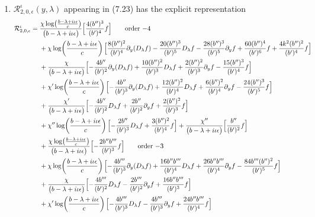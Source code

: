\documentclass[reqno,11pt]{amsart}
\numberwithin{equation}{section}
\newcommand{\p}{\partial}
\newcommand{\D}{D_\lambda}
\numberwithin{equation}{section} %
\begin{document}
\begin{enumerate}
\item $\mathcal{R}^\iota_{2,0,\epsilon}(y,\lambda)$ appearing in (7.23) has the explicit representation
\setlength{\jot}{3pt}
\begin{align}
\mathcal{R}^\iota_{2,0,\epsilon}={}&\frac{\chi\log\!\left(\frac{b -\lambda+i\iota\epsilon}{c}\right)}{\bigl(b -\lambda+i\iota\epsilon\bigr)}\Bigl[\frac{4 (b'' )^{3}}{(b' )^{4}} f\Bigr]\tag*{\text{order $-4$}}\\
&+\chi\log\!\left(\frac{b -\lambda+i\iota\epsilon}{c}\right)\Bigl[\frac{8 (b'' )^{2}}{(b' )^{4}} \p_y(\D f)- \frac{20 (b'' )^{3}}{(b' )^{5}} \D f- \frac{28 (b'' )^{3}}{(b' )^{5}} \p_y f+\frac{60 (b'' )^{4}}{(b' )^{6}} f+\frac{4 k^2 (b'' )^{2}}{(b' )^{4}} f\Bigr]\notag\\
&+\frac{\chi}{\bigl(b -\lambda+i\iota\epsilon\bigr)}\Bigl[- \frac{4 b'' }{(b' )^{2}} \p_y(\D f)+\frac{10 (b'' )^{2}}{(b' )^{3}} \D f+\frac{2 (b'' )^{2}}{(b' )^{3}} \p_y f- \frac{15 (b'' )^{3}}{(b' )^{4}} f\Bigr]\notag\\
&+\chi'\log\!\left(\frac{b -\lambda+i\iota\epsilon}{c}\right)\Bigl[- \frac{4 b'' }{(b' )^{3}} \p_y(\D f)+\frac{12 (b'' )^{2}}{(b' )^{4}} \D f+\frac{6 (b'' )^{2}}{(b' )^{4}} \p_y f- \frac{24 (b'' )^{3}}{(b' )^{5}} f\Bigr]\notag\\
&+\frac{\chi'}{\bigl(b -\lambda+i\iota\epsilon\bigr)}\Bigl[- \frac{4 b'' }{(b' )^{2}} \D f+\frac{2 b'' }{(b' )^{2}} \p_y f+\frac{2 (b'' )^{2}}{(b' )^{3}} f\Bigr]\notag\\
&+\chi''\log\!\left(\frac{b -\lambda+i\iota\epsilon}{c}\right)\Bigl[- \frac{2 b'' }{(b' )^{3}} \D f+\frac{3 (b'' )^{2}}{(b' )^{4}} f\Bigr]+\frac{\chi''}{\bigl(b -\lambda+i\iota\epsilon\bigr)}\Bigl[\frac{b'' }{(b' )^{2}} f\Bigr]\notag\\
&+\frac{\chi\log\!\left(\frac{b -\lambda+i\iota\epsilon}{c}\right)}{\bigl(b -\lambda+i\iota\epsilon\bigr)}\Bigl[- \frac{2 b''  b''' }{(b' )^{3}} f\Bigr]\tag*{\text{order $-3$}}\\
&+\chi\log\!\left(\frac{b -\lambda+i\iota\epsilon}{c}\right)\Bigl[- \frac{4 b''' }{(b' )^{3}} \p_y(\D f)+\frac{16 b''  b''' }{(b' )^{4}} \D f+\frac{26 b''  b''' }{(b' )^{4}} \p_y f- \frac{84 b'''  (b'' )^{2}}{(b' )^{5}} f\Bigr]\notag\\
&+\frac{\chi}{\bigl(b -\lambda+i\iota\epsilon\bigr)}\Bigl[- \frac{4 b''' }{(b' )^{2}} \D f- \frac{2 b''' }{(b' )^{2}} \p_y f+\frac{16 b''  b''' }{(b' )^{3}} f\Bigr]\notag\\
&+\chi'\log\!\left(\frac{b -\lambda+i\iota\epsilon}{c}\right)\Bigl[- \frac{4 b''' }{(b' )^{3}} \D f- \frac{4 b''' }{(b' )^{3}} \p_y f+\frac{24 b''  b''' }{(b' )^{4}} f\Bigr]\notag\\

\end{align}
\end{enumerate}
\end{document}

